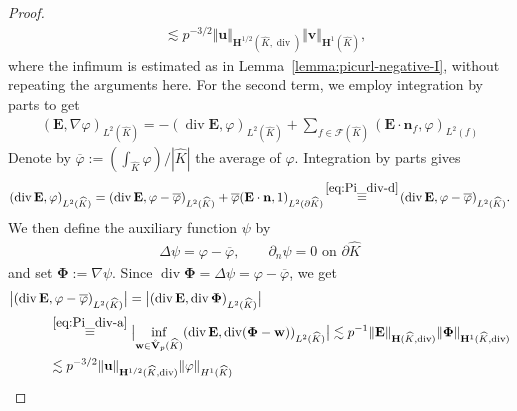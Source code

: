 \documentclass{article}
\begin{document}
\begin{proof}
\begin{align*}
&\lesssim p^{-3/2} \Vert\mathbf{u}\Vert_{\mathbf{H}^{1/2}(\widehat{K},\operatorname{div})} \Vert\mathbf{v}\Vert_{\mathbf{H}^1(\widehat{K})},
\end{align*}
where the infimum is estimated as in Lemma~\ref{lemma:picurl-negative-I}, without repeating the arguments here. For the second term, we employ integration by parts to get
\begin{align}
\label{eq:lemma:duality-again-div-40}
(\mathbf{E},\nabla\varphi)_{L^2(\widehat{K})} = -(\operatorname{div}\mathbf{E},\varphi)_{L^2(\widehat{K})} + \sum_{f\in\mathcal{F}(\widehat{K})} (\mathbf{E}\cdot\mathbf{n}_f,\varphi)_{L^2(f)}
\end{align}
Denote by $\overline{\varphi}:=(\int_{\widehat{K}}\varphi)/|\widehat{K}|$ the average of $\varphi$. Integration by parts gives
\begin{align}
\label{eq:lemma:duality-again-div-60}
(\operatorname{div}\mathbf{E},\varphi)_{L^2(\widehat{K})} = (\operatorname{div}\mathbf{E},\varphi-\overline{\varphi})_{L^2(\widehat{K})} + \overline{\varphi}(\mathbf{E}\cdot\mathbf{n},1)_{L^2(\partial\widehat{K})} \!\overset{\eqref{eq:Pi_div-d}}{=}\! (\operatorname{div}\mathbf{E},\varphi-\overline{\varphi})_{L^2(\widehat{K})}.
\end{align}
We then define the auxiliary function $\psi$ by
\begin{align*}
\Delta\psi=\varphi-\overline{\varphi}, \qquad \partial_n\psi=0 \text{ on }\partial\widehat{K}
\end{align*}
and set $\boldsymbol{\Phi}:=\nabla\psi$. Since $\operatorname{div}\boldsymbol{\Phi}=\Delta\psi=\varphi-\overline{\varphi}$, we get
\begin{align}
\label{eq:lemma:duality-again-div-80}
\big| (\operatorname{div}\mathbf{E}&,\varphi-\overline{\varphi})_{L^2(\widehat{K})} \big| 
= \big| (\operatorname{div}\mathbf{E},\operatorname{div}\boldsymbol{\Phi})_{L^2(\widehat{K})} \big| \\
&\overset{\eqref{eq:Pi_div-a}}{=} 
\bigl| 
\operatorname*{inf}_{\mathbf{w}\in\mathring{\mathbf{V}}_p(\widehat{K})} (\operatorname{div}\mathbf{E},\operatorname{div}(\boldsymbol{\Phi}-\mathbf{w}))_{L^2(\widehat{K})} \bigr|
\label{eq:lemma:duality-again-div-82}
\lesssim p^{-1} \Vert\mathbf{E}\Vert_{\mathbf{H}(\widehat{K},\operatorname{div})} 
                 \Vert\boldsymbol{\Phi}\Vert_{\mathbf{H}^1(\widehat{K},\operatorname{div})} \\
&\lesssim p^{-3/2} \Vert\mathbf{u}\Vert_{\mathbf{H}^{1/2}(\widehat{K},\operatorname{div})} 
                \Vert\varphi \Vert_{H^1(\widehat{K})}

\end{align}
\end{proof}
\end{document}
